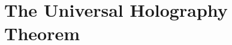 
\providecommand{\SCchtop}{\mathsf{SC}^{\mathrm{ch},\mathrm{top}}}
\providecommand{\HTQFT}{\mathsf{HT\text{-}QFT}}
\providecommand{\ChirAlg}{\mathsf{ChirAlg}}
\providecommand{\HTGauge}{\mathsf{HT\text{-}Gauge}}
\providecommand{\Obs}{\mathsf{Obs}}
\providecommand{\Fact}{\mathrm{Fact}}
\providecommand{\ChirHoch}{\mathrm{ChirHoch}}
\providecommand{\Hoch}{\mathrm{Hoch}}
\providecommand{\HH}{\mathrm{HH}}
\providecommand{\FM}{\mathrm{FM}}
\providecommand{\Conf}{\mathrm{Conf}}
\providecommand{\Ran}{\mathrm{Ran}}
\providecommand{\Barch}{\mathrm{B}^{\mathrm{ch}}}
\providecommand{\Cobarch}{\Omega^{\mathrm{ch}}}
\providecommand{\RHom}{\mathbf{R}\mathrm{Hom}}
\providecommand{\End}{\mathrm{End}}
\providecommand{\Mod}{\mathrm{Mod}}
\providecommand{\MC}{\mathrm{MC}}
\providecommand{\id}{\mathrm{id}}
\providecommand{\cA}{\mathcal{A}}
\providecommand{\cB}{\mathcal{B}}
\providecommand{\cC}{\mathcal{C}}
\providecommand{\cE}{\mathcal{E}}
\providecommand{\cF}{\mathcal{F}}
\providecommand{\cO}{\mathcal{O}}
\providecommand{\cT}{\mathcal{T}}
\providecommand{\cW}{\mathcal{W}}
\providecommand{\cZ}{\mathcal{Z}}
\providecommand{\fg}{\mathfrak{g}}
\providecommand{\Zder}{Z^{\mathrm{der}}_{\mathrm{ch}}}
\providecommand{\SugA}{T^{\mathrm{Sug}}}
\providecommand{\BRST}{\mathrm{BRST}}
\providecommand{\DS}{\mathrm{DS}}
\providecommand{\Phihol}{\Phi_{\mathrm{hol}}}
\providecommand{\ClaimStatusProvedHere}{}
\providecommand{\ClaimStatusProvedElsewhere}{}
\providecommand{\ClaimStatusConditional}{}
\providecommand{\ClaimStatusConjectured}{}

\chapter{The Universal Holography Theorem}
\label{ch:universal-holography-functor}

